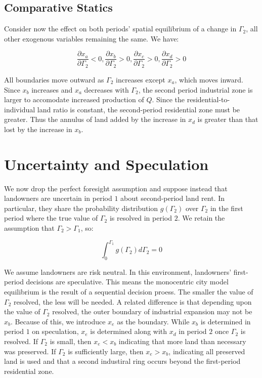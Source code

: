 \subsection{Comparative Statics}

Consider now the effect on both periods' spatial equilibrium of a change in $\Gamma_2$, all other exogenous variables remaining the same. We have:

\begin{equation*}
    \frac{\partial x_a}{\partial \Gamma_2} < 0, \frac{\partial x_b}{\partial \Gamma_2} > 0, \frac{\partial x_c}{\partial \Gamma_2} > 0, \frac{\partial x_d}{\partial \Gamma_2} > 0
\end{equation*}

All boundaries move outward as $\Gamma_2$ increases except $x_a$, which moves inward. Since $x_b$ increases and $x_a$ decreases with $\Gamma_2$, the second period industrial zone is larger to accomodate increased production of $Q$. Since the residential-to-individual land ratio is constant, the second-period residential zone must be greater. Thus the annulus of land added by the increase in $x_d$ is greater than that lost by the increase in $x_b$.

\section{Uncertainty and Speculation}

We now drop the perfect foresight assumption and suppose instead that landowners are uncertain in period $1$ about second-period land rent. In particular, they share the probability distribution $g(\Gamma_2)$ over $\Gamma_2$ in the first period where the true value of $\Gamma_2$ is resolved in period $2$. We retain the assumption that $\Gamma_2 > \Gamma_1$, so:

\begin{equation*}
    \int_0^{\Gamma_1} g(\Gamma_2) d\Gamma_2 = 0
\end{equation*}

We assume landowners are risk neutral. In this environment, landowners' first-period decisions are speculative. This means the monocentric city model equilibrium is the result of a sequential decision proess. The smaller the value of $\Gamma_2$ resolved, the less will be needed. A related difference is that depending upon the value of $\Gamma_2$ resolved, the outer boundary of industrial expansion may not be $x_b$. Because of this, we introduce $x_e$ as the boundary. While $x_b$ is determined in period $1$ on speculation, $x_e$ is determined along with $x_d$ in period $2$ once $\Gamma_2$ is resolved. If $\Gamma_2$ is small, then $x_e < x_b$ indicating that more land than necessary was preserved. If $\Gamma_2$ is sufficiently large, then $x_e > x_b$, indicating all preserved land is used and that a second industiral ring occurs beyond the first-period residential zone.

